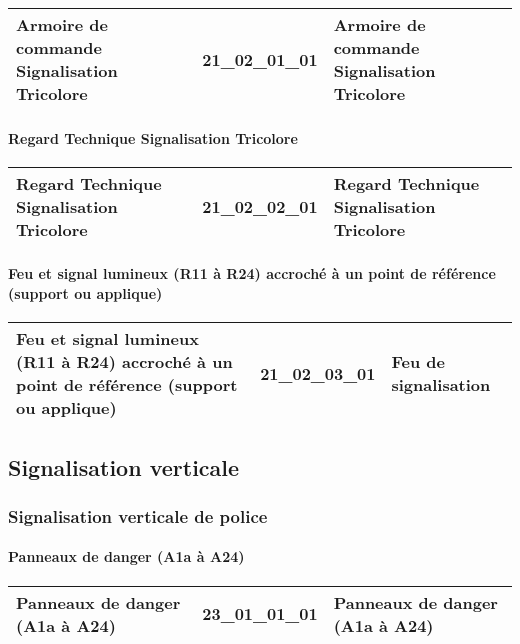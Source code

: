 \documentclass[12pt,titlepage]{book}
\begin{document}
\renewcommand{\arraystretch}{1.2}
\begin{supertabular}{|p{10cm}|c|p{15cm}|}
 Armoire de commande Signalisation Tricolore & 21\_02\_01\_01 & Armoire de commande Signalisation Tricolore\\
\hline
\end{supertabular}


\paragraph{Regard Technique Signalisation Tricolore}
\noindent
\vspace{\baselineskip}

\renewcommand{\arraystretch}{1.2}
\begin{supertabular}{|p{10cm}|c|p{15cm}|}
 Regard Technique Signalisation Tricolore & 21\_02\_02\_01 & Regard Technique Signalisation Tricolore\\
\hline
\end{supertabular}


\paragraph{Feu et signal lumineux (R11 à R24) accroché à un point de référence (support ou applique)}
\noindent
\vspace{\baselineskip}

\renewcommand{\arraystretch}{1.2}
\begin{supertabular}{|p{10cm}|c|p{15cm}|}
 Feu et signal lumineux (R11 à R24) accroché à un point de référence (support ou applique) & 21\_02\_03\_01 & Feu de signalisation\\
\hline
\end{supertabular}
\subsection{Signalisation verticale}
\subsubsection{\large Signalisation verticale de police}
\paragraph{Panneaux de danger (A1a à A24)}
\noindent
\vspace{\baselineskip}

\renewcommand{\arraystretch}{1.2}
\begin{supertabular}{|p{10cm}|c|p{15cm}|}
 Panneaux de danger (A1a à A24) & 23\_01\_01\_01 & Panneaux de danger (A1a à A24)\\
\hline
\end{supertabular}
\end{document}
